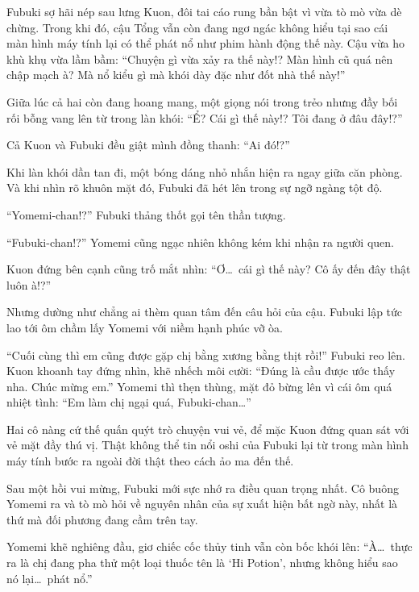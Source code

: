 \documentclass[../main.tex]{subfiles}
\begin{document}

Fubuki sợ hãi nép sau lưng Kuon, đôi tai cáo rung bần bật vì vừa tò mò vừa dè chừng. Trong khi đó, cậu Tổng vẫn còn đang ngơ ngác không hiểu tại sao cái màn hình máy tính lại có thể phát nổ như phim hành động thế này. Cậu vừa ho khù khụ vừa lầm bầm: ``Chuyện gì vừa xảy ra thế này!? Màn hình cũ quá nên chập mạch à? Mà nổ kiểu gì mà khói dày đặc như đốt nhà thế này!''

Giữa lúc cả hai còn đang hoang mang, một giọng nói trong trẻo nhưng đầy bối rối bỗng vang lên từ trong làn khói: ``Ể? Cái gì thế này!? Tôi đang ở đâu đây!?''

Cả Kuon và Fubuki đều giật mình đồng thanh: ``Ai đó!?''

Khi làn khói dần tan đi, một bóng dáng nhỏ nhắn hiện ra ngay giữa căn phòng. Và khi nhìn rõ khuôn mặt đó, Fubuki đã hét lên trong sự ngỡ ngàng tột độ.


``Yomemi-chan!?'' Fubuki thảng thốt gọi tên thần tượng.

``Fubuki-chan!?'' Yomemi cũng ngạc nhiên không kém khi nhận ra người quen.

Kuon đứng bên cạnh cũng trố mắt nhìn: ``Ơ\dots\ cái gì thế này? Cô ấy đến đây thật luôn à!?''

Nhưng dường như chẳng ai thèm quan tâm đến câu hỏi của cậu. Fubuki lập tức lao tới ôm chầm lấy Yomemi với niềm hạnh phúc vỡ òa.


``Cuối cùng thì em cũng được gặp chị bằng xương bằng thịt rồi!'' Fubuki reo lên.
Kuon khoanh tay đứng nhìn, khẽ nhếch môi cười: ``Đúng là cầu được ước thấy nha. Chúc mừng em.''
Yomemi thì thẹn thùng, mặt đỏ bừng lên vì cái ôm quá nhiệt tình: ``Em làm chị ngại quá, Fubuki-chan\dots''

Hai cô nàng cứ thế quấn quýt trò chuyện vui vẻ, để mặc Kuon đứng quan sát với vẻ mặt đầy thú vị. Thật không thể tin nổi oshi của Fubuki lại từ trong màn hình máy tính bước ra ngoài đời thật theo cách ảo ma đến thế.

\ct

Sau một hồi vui mừng, Fubuki mới sực nhớ ra điều quan trọng nhất. Cô buông Yomemi ra và tò mò hỏi về nguyên nhân của sự xuất hiện bất ngờ này, nhất là thứ mà đối phương đang cầm trên tay.

Yomemi khẽ nghiêng đầu, giơ chiếc cốc thủy tinh vẫn còn bốc khói lên: ``À\dots\ thực ra là chị đang pha thử một loại thuốc tên là `Hi Potion', nhưng không hiểu sao nó lại\dots\ phát nổ.''
\end{document}
